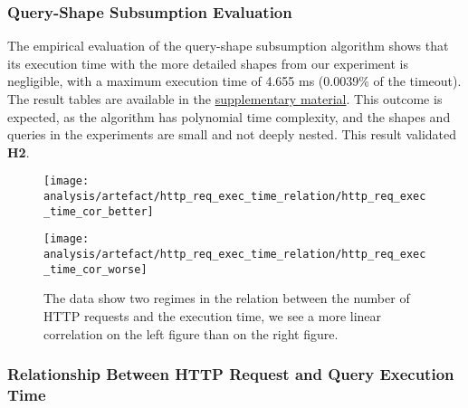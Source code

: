 \subsubsection{Query-Shape Subsumption Evaluation}
The empirical evaluation of the query-shape subsumption algorithm shows that its execution time with the more detailed shapes from our experiment is negligible, with a maximum execution time of 4.655 ms (0.0039\% of the timeout).
The result tables are available in the \hyperref[sec:supplementalMaterial]{supplementary material}.
This outcome is expected, as the algorithm has polynomial time complexity, and the shapes and queries in the experiments are small and not deeply nested.
This result validated \textbf{H2}.

\iffalse
\begin{figure}[htbp]
    \centering
    \begin{minipage}[t]{0.40\linewidth}
        \centering
        \texttt{[image: analysis/artefact/http\_req\_exec\_time\_relation/http\_req\_exec\_time\_cor\_better]}
        \label{fig:http_req_exec_time_cor_better}
    \end{minipage}
    \hspace{0.05\textwidth}
    \begin{minipage}[t]{0.40\linewidth}
        \centering
        \texttt{[image: analysis/artefact/http\_req\_exec\_time\_relation/http\_req\_exec\_time\_cor\_worse]}
        \label{fig:http_req_exec_time_cor_worse}
    \end{minipage}

    \caption{
        The data show two regimes in the relation between the number of HTTP requests and the execution time, 
        we see a more linear correlation on the left figure than on the right figure.
        }
    \label{fig:http_req_exec_time_cor}
\end{figure}

\subsubsection{Relationship Between HTTP Request and Query Execution Time}


